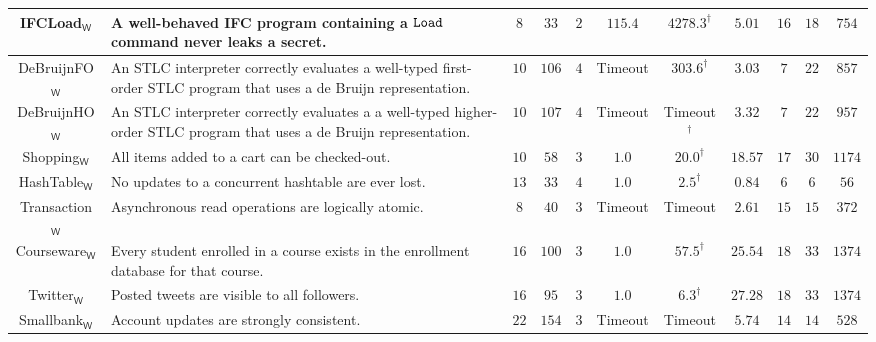 \begin{table}[t!]
\begin{tabular}{c|P{4.8cm}||ccc||cc||c|ccc}
\midrule
\textsf{IFCLoad}$_{\mathsf{W}}$\cite{pbt-ifc} & {\scriptsize A well-behaved IFC program containing a ${\tt Load}$ command never leaks a secret.} & $8$ & $33$ & $2$ & $115.4$ & $4278.3^{\dagger}$ & $5.01$ & $16$ & $18$ & $754$\\
\midrule
\textsf{DeBruijnFO}$_{\mathsf{W}}$\cite{CoverageType} & {\scriptsize An STLC interpreter correctly evaluates a
  well-typed first-order STLC program that uses a de Bruijn representation.} & $10$ & $106$ & $4$ & {\tiny Timeout} & $303.6^{\dagger}$ & $3.03$ & $7$ & $22$ & $857$\\
\midrule
\textsf{DeBruijnHO}$_{\mathsf{W}}$\cite{CoverageType} & {\scriptsize An STLC interpreter correctly evaluates a
  a well-typed higher-order STLC program that uses a de Bruijn representation.} & $10$ & $107$ & $4$ & {\tiny Timeout} & {\tiny Timeout}$^{\dagger}$ & $3.32$ & $7$ & $22$ & $957$\\
\midrule
\midrule
\textsf{Shopping}$_{\mathsf{W}}$\cite{MonkeyDB} & {\scriptsize All items added to a cart can be checked-out.} & $10$ & $58$ & $3$ & $1.0$ & $20.0^{\dagger}$ & $18.57$ & $17$ & $30$ & $1174$\\
\midrule
\textsf{HashTable}$_{\mathsf{W}}$\cite{OcamlMulticorePBT} & {\scriptsize No updates to a concurrent hashtable are ever lost.} & $13$ & $33$ & $4$ & $1.0$ & $2.5^{\dagger}$ & $0.84$ & $6$ & $6$ & $56$\\
\midrule
\textsf{Transaction}$_{\mathsf{W}}$ & {\scriptsize Asynchronous read operations are logically atomic.} & $8$ & $40$ & $3$ & {\tiny Timeout} & {\tiny Timeout} & $2.61$ & $15$ & $15$ & $372$\\
\midrule
\textsf{Courseware}$_{\mathsf{W}}$\cite{MonkeyDB} & {\scriptsize Every student enrolled in a course exists in the
  enrollment database for that course.} & $16$ & $100$ & $3$ & $1.0$ & $57.5^{\dagger}$ & $25.54$ & $18$ & $33$ & $1374$\\
\midrule
\textsf{Twitter}$_{\mathsf{W}}$\cite{MonkeyDB} & {\scriptsize Posted tweets are visible to all followers.} & $16$ & $95$ & $3$ & $1.0$ & $6.3^{\dagger}$ & $27.28$ & $18$ & $33$ & $1374$\\
\midrule
\textsf{Smallbank}$_{\mathsf{W}}$\cite{OLTPBench} & {\scriptsize Account updates are strongly consistent.} & $22$ & $154$ & $3$ & {\tiny Timeout} & {\tiny Timeout} & $5.74$ & $14$ & $14$ & $528$\\
\bottomrule
\end{tabular}
\label{tab:evaluation-rich}
\vspace*{-.15in}
\end{table}



